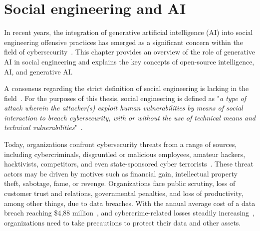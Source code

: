 

\chapter{Social engineering and AI\label{chapter:background}}

%
%
In recent years, the integration of generative artificial intelligence (AI) into social engineering offensive practices has emerged as a significant concern within the field of cybersecurity~\citep{blauth_AI_Crime_Overview_Malicious_Use_Abuse_2022, king_AI_Crime_Interdisciplinary_Analysis_2019, mirsky_Threat_Offensive_AI_Organizations_2023}. This chapter provides an overview of the role of generative AI in social engineering and explains the key concepts of open-source intelligence, AI, and generative AI.




%
%
A consensus regarding the strict definition of social engineering is lacking in the field~\citep{hatfield_SE_Evolution_Concept_2018}. For the purposes of this thesis, social engineering is defined as "\textit{a type of attack wherein the attacker(s) exploit human vulnerabilities by means of social interaction to breach cybersecurity, with or without the use of technical means and technical vulnerabilities}"~\citep{wang_Defining_Social_Engineering_2020}.



%
%
Today, organizations confront cybersecurity threats from a range of sources, including cybercriminals, disgruntled or malicious employees, amateur hackers, hacktivists, competitors, and even state-sponsored cyber terrorists~\citep{mirsky_Threat_Offensive_AI_Organizations_2023}. These threat actors may be driven by motives such as financial gain, intellectual property theft, sabotage, fame, or revenge. Organizations face public scrutiny, loss of customer trust and relations, governmental penalties, and loss of productivity, among other things, due to data breaches. With the annual average cost of a data breach reaching \$4,88 million~\citep{ibm_Cost_Data_Breach_Report_2024}, and cybercrime-related losses steadily increasing~\citep{verizon_Data_Breach_Investigations_Report_2024}, organizations need to take precautions to protect their data and other assets.


